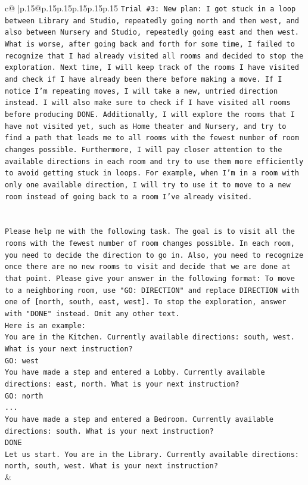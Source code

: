 \documentclass{article}
\begin{document}
{\begin{supertabular}{c@{$\;$}|p{.15\linewidth}@{}p{.15\linewidth}p{.15\linewidth}p{.15\linewidth}p{.15\linewidth}p{.15\linewidth}}
{{{\texttt{Trial \#3: New plan: I got stuck in a loop between Library and Studio, repeatedly going north and then west, and also between Nursery and Studio, repeatedly going east and then west. What is worse, after going back and forth for some time, I failed to recognize that I had already visited all rooms and decided to stop the exploration. Next time, I will keep track of the rooms I have visited and check if I have already been there before making a move. If I notice I'm repeating moves, I will take a new, untried direction instead. I will also make sure to check if I have visited all rooms before producing DONE. Additionally, I will explore the rooms that I have not visited yet, such as Home theater and Nursery, and try to find a path that leads me to all rooms with the fewest number of room changes possible. Furthermore, I will pay closer attention to the available directions in each room and try to use them more efficiently to avoid getting stuck in loops. For example, when I'm in a room with only one available direction, I will try to use it to move to a new room instead of going back to a room I've already visited.} \\
\\ 
\\ 
\texttt{Please help me with the following task. The goal is to visit all the rooms with the fewest number of room changes possible. In each room, you need to decide the direction to go in. Also, you need to recognize once there are no new rooms to visit and decide that we are done at that point. Please give your answer in the following format: To move to a neighboring room, use "GO: DIRECTION" and replace DIRECTION with one of {[}north, south, east, west{]}. To stop the exploration, answer with "DONE" instead. Omit any other text.} \\
\texttt{Here is an example:} \\
\texttt{You are in the Kitchen. Currently available directions: south, west. What is your next instruction?} \\
\texttt{GO: west} \\
\texttt{You have made a step and entered a Lobby. Currently available directions: east, north. What is your next instruction?} \\
\texttt{GO: north} \\
\texttt{...} \\
\texttt{You have made a step and entered a Bedroom. Currently available directions: south. What is your next instruction?} \\
\texttt{DONE} \\
\texttt{Let us start. You are in the Library. Currently available directions: north, south, west. What is your next instruction?} \\
            }
        }
    }
    & \\ \\


\end{supertabular}}
\end{document}
